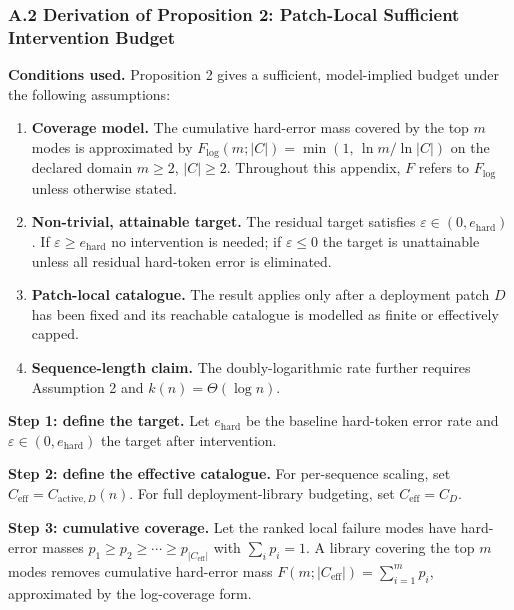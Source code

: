 \documentclass[
]{article}
\providecommand{\tightlist}{%
  \setlength{\itemsep}{0pt}\setlength{\parskip}{0pt}}
\begin{document}
\subsubsection{A.2 Derivation of Proposition 2: Patch-Local Sufficient
Intervention
Budget}\label{a.2-derivation-of-proposition-2-patch-local-sufficient-intervention-budget}

\textbf{Conditions used.} Proposition 2 gives a sufficient,
model-implied budget under the following assumptions:

\begin{enumerate}
\def\labelenumi{\arabic{enumi}.}
\tightlist
\item
  \textbf{Coverage model.} The cumulative hard-error mass covered by the
  top \(m\) modes is approximated by
  \(F_{\log}(m; |C|) = \min(1,\, \ln m / \ln |C|)\) on the declared
  domain \(m \geq 2\), \(|C| \geq 2\). Throughout this appendix, \(F\)
  refers to \(F_{\log}\) unless otherwise stated.
\item
  \textbf{Non-trivial, attainable target.} The residual target satisfies
  \(\varepsilon \in (0, e_{\text{hard}})\). If
  \(\varepsilon \geq e_{\text{hard}}\) no intervention is needed; if
  \(\varepsilon \leq 0\) the target is unattainable unless all residual
  hard-token error is eliminated.
\item
  \textbf{Patch-local catalogue.} The result applies only after a
  deployment patch \(D\) has been fixed and its reachable catalogue is
  modelled as finite or effectively capped.
\item
  \textbf{Sequence-length claim.} The doubly-logarithmic rate further
  requires Assumption 2 and \(k(n) = \Theta(\log n)\).
\end{enumerate}

\textbf{Step 1: define the target.} Let \(e_{\text{hard}}\) be the
baseline hard-token error rate and
\(\varepsilon \in (0, e_{\text{hard}})\) the target after intervention.

\textbf{Step 2: define the effective catalogue.} For per-sequence
scaling, set \(C_{\text{eff}} = C_{\text{active},D}(n)\). For full
deployment-library budgeting, set \(C_{\text{eff}} = C_D\).

\textbf{Step 3: cumulative coverage.} Let the ranked local failure modes
have hard-error masses
\(p_1 \geq p_2 \geq \cdots \geq p_{|C_{\text{eff}}|}\) with
\(\sum_i p_i = 1\). A library covering the top \(m\) modes removes
cumulative hard-error mass
\(F(m; |C_{\text{eff}}|) = \sum_{i=1}^{m} p_i\), approximated by the
log-coverage form.
\end{document}
